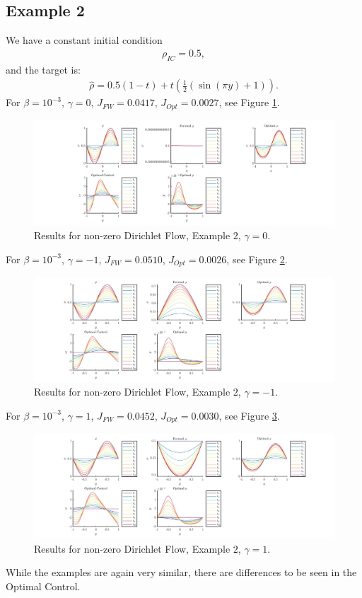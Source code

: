 \documentclass[11pt, a4paper]{article}
\theoremstyle{definition}
\begin{document}
\subsection{Example 2}
We have a constant initial condition 
\begin{align*}
\rho_{IC}= 0.5,
\end{align*}
and the target is:
\begin{align*}
\hat \rho = 0.5(1-t) + t(\frac{1}{2}(\sin(\pi y ) +1)).
\end{align*}
For $\beta = 10^{-3}$, $\gamma = 0$, $J_{FW} = 0.0417$, $J_{Opt} = 0.0027$, see Figure \ref{Res2D05}.
\begin{figure}[h]
	\includegraphics[scale=0.3]{ResD052.jpg}
	\caption{Results for non-zero Dirichlet Flow, Example $2$, $\gamma = 0$.}
	\label{Res2D05}
\end{figure}
For $\beta = 10^{-3}$, $\gamma = -1$, $J_{FW} = 0.0510$, $J_{Opt} = 0.0026$, see Figure \ref{Res2aD05}.
\begin{figure}[h]
	\includegraphics[scale=0.3]{ResD052a.jpg}
	\caption{Results for non-zero Dirichlet Flow, Example $2$, $\gamma = -1$.}
	\label{Res2aD05}
\end{figure}
For $\beta = 10^{-3}$, $\gamma = 1$, $J_{FW} = 0.0452$, $J_{Opt} = 0.0030$, see Figure \ref{Res2bD05}.
\begin{figure}[h]
	\includegraphics[scale=0.3]{ResD052b.jpg}
	\caption{Results for non-zero Dirichlet Flow, Example $2$, $\gamma = 1$.}
	\label{Res2bD05}
\end{figure}
While the examples are again very similar, there are differences to be seen in the Optimal Control.
\end{document}
